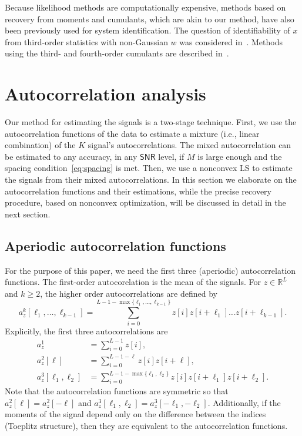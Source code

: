 \documentclass[english,11pt]{article}
\newcommand{\TODO}[1]{{\color{red}{[#1]}}}
\numberwithin{equation}{section}
\theoremstyle{plain}
\theoremstyle{definition}
\theoremstyle{remark}
\theoremstyle{plain}
\theoremstyle{remark}
\theoremstyle{plain}
\theoremstyle{plain}
\newcommand{\RL}{\mathbb{R}^L}
\newcommand{\SNR}{{\textsf{SNR}}}
\begin{document}
Because likelihood methods are computationally expensive, methods based
on recovery from moments and cumulants, which are akin to our method, have
also been previously used for system identification. The question of identifiability
of $x$ from third-order statistics with non-Gaussian $w$ was considered in~\cite{lii1982deconvolution}. \TODO{how is it different from bispectrum inversion?}
Methods using the third- and fourth-order cumulants are described in~\cite{giannakis1989identification,tugnait1984identification}.


\section{Autocorrelation analysis}   \label{sec:autocorrelation}

Our method for estimating the signals is a two-stage technique. 
First, we use the autocorrelation functions of the data to estimate a mixture (i.e., linear combination) of the $K$ signal's autocorrelations. The mixed autocorrelation can be estimated to any accuracy, in any $\SNR$ level, if $M$ is large enough and the spacing condition~\eqref{eq:spacing} is met. Then, we  use a nonconvex LS  to estimate the signals from their mixed autocorrelations. 
In this section we elaborate on the autocorrelation functions and their estimations, while the precise recovery procedure, based on nonconvex optimization, will be discussed in detail in the next section.


\subsection{Aperiodic autocorrelation functions} \label{sec:aperiodic_ac}

For the purpose of this paper, we need the first three (aperiodic) autocorrelation functions. The first-order autocorelation is the mean of the signals. For  
$z\in\RL$ and $k\geq 2$, the higher order autocorrelations are defined by
\begin{equation} \label{eq:ac_general}
a_z^k[\ell_1,\ldots,\ell_{k-1}] =  \sum_{i=0}^{L-1-\max\{\ell_1,\ldots,\ell_{k-1}\}} z[i]z[i+\ell_1]\ldots z[i+\ell_{k-1}].
\end{equation}
Explicitly, the first three autocorrelations are
\begin{align} \label{eq:autocorrelations}
a_z^1 &= \sum_{i=0}^{L-1} z[i], \nonumber\\
a_z^2[\ell] &= \sum_{i=0}^{L-1-\ell} z[i]z[i+\ell], \nonumber\\
a_z^3[\ell_1,\ell_2] &= \sum_{i=0}^{L-1-\max\{\ell_1,\ell_2\}} z[i]z[i+\ell_1]z[i+\ell_2]. 
\end{align}
Note that the autocorrelation functions are symmetric so that $a_z^2[\ell] = a_z^2[-\ell]$ and $a_z^3[\ell_1,\ell_2] = a_z^3[-\ell_1,-\ell_2]$. 
Additionally, if the moments of the signal depend only on the difference between the indices (Toeplitz structure), then they are equivalent to the autocorrelation functions.
\end{document}
